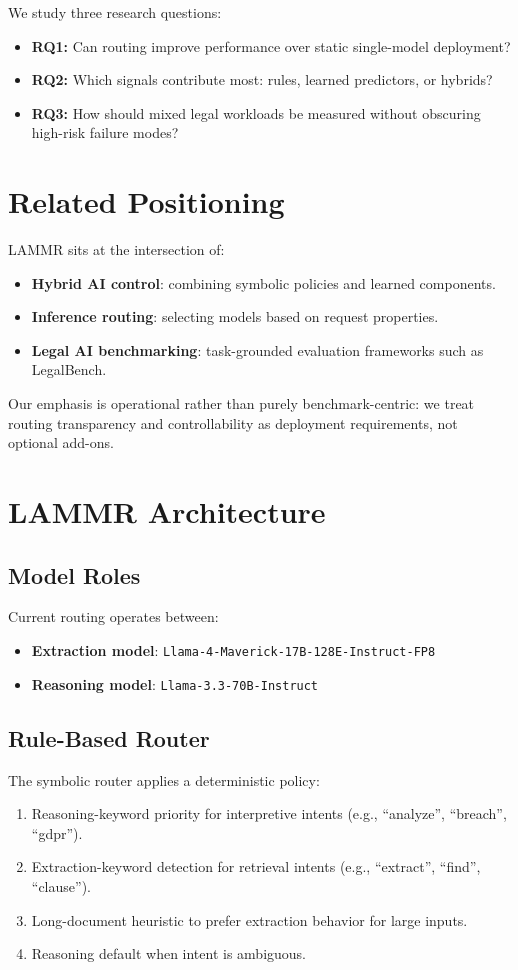 We study three research questions:
\begin{itemize}[leftmargin=*]
  \item \textbf{RQ1:} Can routing improve performance over static single-model deployment?
  \item \textbf{RQ2:} Which signals contribute most: rules, learned predictors, or hybrids?
  \item \textbf{RQ3:} How should mixed legal workloads be measured without obscuring high-risk failure modes?
\end{itemize}

\section{Related Positioning}
LAMMR sits at the intersection of:
\begin{itemize}[leftmargin=*]
  \item \textbf{Hybrid AI control}: combining symbolic policies and learned components.
  \item \textbf{Inference routing}: selecting models based on request properties.
  \item \textbf{Legal AI benchmarking}: task-grounded evaluation frameworks such as LegalBench.
\end{itemize}

Our emphasis is operational rather than purely benchmark-centric: we treat routing transparency and controllability as deployment requirements, not optional add-ons.

\section{LAMMR Architecture}
\subsection{Model Roles}
Current routing operates between:
\begin{itemize}[leftmargin=*]
  \item \textbf{Extraction model}: \texttt{Llama-4-Maverick-17B-128E-Instruct-FP8}
  \item \textbf{Reasoning model}: \texttt{Llama-3.3-70B-Instruct}
\end{itemize}

\subsection{Rule-Based Router}
The symbolic router applies a deterministic policy:
\begin{enumerate}[leftmargin=*]
  \item Reasoning-keyword priority for interpretive intents (e.g., ``analyze'', ``breach'', ``gdpr'').
  \item Extraction-keyword detection for retrieval intents (e.g., ``extract'', ``find'', ``clause'').
  \item Long-document heuristic to prefer extraction behavior for large inputs.
  \item Reasoning default when intent is ambiguous.
\end{enumerate}

